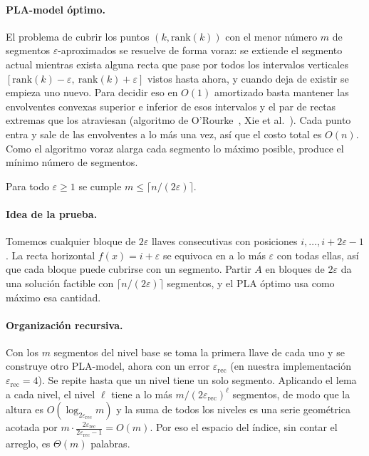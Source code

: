 \paragraph{PLA-model óptimo.} El problema de cubrir los puntos $(k, \mathrm{rank}(k))$ con el
menor número $m$ de segmentos $\varepsilon$-aproximados se resuelve de forma voraz: se extiende el
segmento actual mientras exista alguna recta que pase por todos los intervalos verticales
$[\mathrm{rank}(k)-\varepsilon,\ \mathrm{rank}(k)+\varepsilon]$ vistos hasta ahora, y cuando deja
de existir se empieza uno nuevo. Para decidir eso en $O(1)$ amortizado basta mantener las
envolventes convexas superior e inferior de esos intervalos y el par de rectas extremas que
los atraviesan (algoritmo de O'Rourke~\cite{orourke1981}, Xie et al.~\cite{xie2014}). Cada punto
entra y sale de las envolventes a lo más una vez, así que el costo total es $O(n)$. Como el
algoritmo voraz alarga cada segmento lo máximo posible, produce el mínimo número de segmentos.

\begin{lema}
Para todo $\varepsilon\ge 1$ se cumple $m \le \lceil n/(2\varepsilon)\rceil$.
\end{lema}
\paragraph{Idea de la prueba.} Tomemos cualquier bloque de $2\varepsilon$ llaves consecutivas
con posiciones $i, \dots, i+2\varepsilon-1$. La recta horizontal $f(x) = i + \varepsilon$ se
equivoca en a lo más $\varepsilon$ con todas ellas, así que cada bloque puede cubrirse con un
segmento. Partir $A$ en bloques de $2\varepsilon$ da una solución factible con
$\lceil n/(2\varepsilon)\rceil$ segmentos, y el PLA óptimo usa como máximo esa cantidad.

\paragraph{Organización recursiva.} Con los $m$ segmentos del nivel base se toma la primera llave
de cada uno y se construye otro PLA-model, ahora con un error $\varepsilon_{\text{rec}}$ (en
nuestra implementación $\varepsilon_{\text{rec}}=4$). Se repite hasta que un nivel tiene un solo
segmento. Aplicando el lema a cada nivel, el nivel $\ell$ tiene a lo más
$m/(2\varepsilon_{\text{rec}})^{\ell}$ segmentos, de modo que la altura es
$O(\log_{2\varepsilon_{\text{rec}}} m)$ y la suma de todos los niveles es una serie geométrica
acotada por $m\cdot\frac{2\varepsilon_{\text{rec}}}{2\varepsilon_{\text{rec}}-1} = O(m)$. Por eso el
espacio del índice, sin contar el arreglo, es $\Theta(m)$ palabras.

